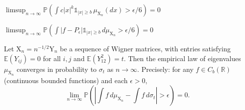 \begin{lemma}
    \label{lem:fP_bound}
    \notready
    $\limsup_{n \to \infty}\mathbb{P}\left(\int c|x|^k\mathbb{1}_{|x|\ge b}\,\mu_{\mathrm{X}_n}(dx) > \epsilon/6\right) = 0 $
\end{lemma}


\begin{lemma}
    \label{lem:fP_zero}
    \notready
    $\limsup_{n \to \infty}  \mathbb{P}\left(\int |f-P_\epsilon| \mathbb{1}_{|x|\ge b}\,d\mu_{\mathrm{X}_n} > \epsilon/6\right) = 0$
\end{lemma}



\begin{proposition}
  \label{prop:Wigner_Semicircle_Law } %
  \notready
  Let $\mathrm{X}_n=n^{-1/2}\mathrm{Y}_n$ be a sequence of Wigner matrices, with entries satisfying $\mathbb{E}(Y_{ij})=0$ for all $i,j$ and $\mathbb{E}(Y_{12}^2)=t$.  Then the empirical law of eigenvalues $\mu_{\mathrm{X}_n}$ converges in probability to $\sigma_t$ as $n\to\infty$.  Precisely: for any $f\in C_b(\mathbb{R})$ (continuous bounded functions) and each $\epsilon>0$,
  $$ \lim_{n\to\infty} \mathbb{P}\left(\left|\int f\,d\mu_{\mathrm{X}_n} - \int f\,d\sigma_t\right|>\epsilon\right)=0. $$
\end{proposition}

